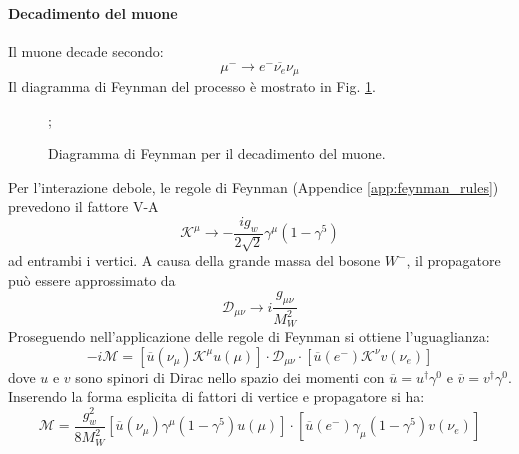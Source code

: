 \documentclass{subnucbo}
\begin{document}
\paragraph{Decadimento del muone} Il muone decade secondo:
\begin{equation}
        \mu^{-} \rightarrow e^{-} \overline{\nu_{e}} \nu_{\mu}
        \label{eq:muon_decay}
\end{equation}
Il diagramma di Feynman del processo è mostrato in Fig. \ref{fig:muon_decay}.
\begin{figure}[!h]
        \centering
        ;
        \caption{Diagramma di Feynman per il decadimento del muone.}
        \label{fig:muon_decay}
\end{figure}
Per l'interazione debole, le regole di Feynman (Appendice \ref{app:feynman_rules}) prevedono il fattore V-A
\begin{equation}
        \mathcal { K } ^ { \mu } \rightarrow - \frac { i g _ { w } } { 2 \sqrt { 2 } } \gamma ^ { \mu } \left( 1 - \gamma ^ { 5 } \right)
\end{equation}
ad entrambi i vertici. A causa della grande massa del bosone $W^{-}$, il propagatore può essere approssimato da
\begin{equation}
         \mathcal { D } _ { \mu \nu } \rightarrow i \frac { g _ { \mu \nu } } { M _ { W } ^ { 2 } }
        \label{eq:propagator}
\end{equation}
Proseguendo nell'applicazione delle regole di Feynman si ottiene l'uguaglianza:
\begin{equation}
        - i \mathcal { M } = \left[ \overline { u } \left( \nu _ { \mu } \right) \mathcal { K } ^ { \mu } u \left( \mu \right) \right] \cdot \mathcal { D } _ { \mu \nu } \cdot \left[ \overline { u } \left( e^{-} \right) \mathcal { K } ^ { \nu } v \left( \nu _ { e } \right) \right]
\end{equation}
dove $u$ e $v$ sono spinori di Dirac nello spazio dei momenti con $\overline { u } = u ^ { \dagger } \gamma ^ { 0 }$ e $\overline { v } = v ^ { \dagger } \gamma ^ { 0 }$. Inserendo la forma esplicita di fattori di vertice e propagatore si ha:
\begin{equation}
        \mathcal { M } = \frac { g _ { w } ^ { 2 } } { 8 M _ { W } ^ { 2 } } \left[ \overline { u } \left( \nu _ { \mu } \right) \gamma ^ { \mu } \left( 1 - \gamma ^ { 5 } \right) u ( \mu ) \right] \cdot \left[ \overline { u } \left( e ^ { - } \right) \gamma _ { \mu } \left( 1 - \gamma ^ { 5 } \right) v \left( \nu _ { e } \right) \right]
        \label{eq:amplitude_muon}
\end{equation}
\end{document}
